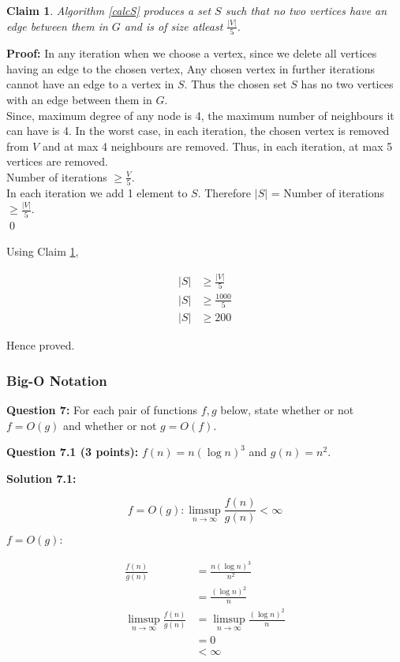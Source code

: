 \documentclass[11pt]{article}
\newtheorem{claim}[theorem]{Claim}
\begin{document}
\begin{claim}
    \label{6.2claim}
    Algorithm \ref{calcS} produces a set $S$ such that no two vertices have an
    edge between them in $G$ and is of size atleast $\frac{|V|}{5}$.
\end{claim}

\textbf{Proof:} In any iteration when we choose a vertex,
since we delete all vertices having
an edge to the chosen vertex, Any chosen vertex in further iterations cannot
have an edge to a vertex in $S$. Thus the chosen set $S$ has no two vertices
with an edge between them in $G$.\\

Since, maximum degree of any node is 4, the maximum number
of neighbours it can have is 4. In the worst case, in each iteration, the
chosen vertex is removed from $V$ and at max 4 neighbours are removed. Thus,
in each iteration, at max 5 vertices are removed.\\

Number of iterations $\ge \frac{V}{5}$.\\

In each iteration we add 1 element to $S$.
Therefore $|S|$ = Number of iterations $\ge \frac{|V|}{5}$.\\

\qed

Using Claim \ref{6.2claim},

\begin{align*}
    |S| &\ge \frac{|V|}{5}\\
    |S| &\ge \frac{1000}{5}\\
    |S| &\ge 200
\end{align*}

Hence proved.

\subsubsection{Big-O Notation}\label{big-o-notation}

\textbf{Question 7:} For each pair of functions \(f,g\) below, state
whether or not \(f=O(g)\) and whether or not \(g=O(f)\).

\textbf{Question 7.1 (3 points):} \(f(n)=n(\log n)^3\) and \(g(n)=n^2\).

\textbf{Solution 7.1:} 

$$
f = O(g): \limsup_{n \rightarrow \infty} \frac{f(n)}{g(n)} < \infty
$$

$f = O(g):$

\begin{align*}
    \frac{f(n)}{g(n)} &= \frac{n(\log{n})^{3}}{n^{2}}\\
    &= \frac{(\log{n})^{2}}{n}\\
    \limsup_{n \rightarrow \infty} \frac{f(n)}{g(n)} &=
    \limsup_{n \rightarrow \infty} \frac{(\log{n})^{2}}{n}\\
    &= 0\\
    &< \infty
\end{align*}
\end{document}
